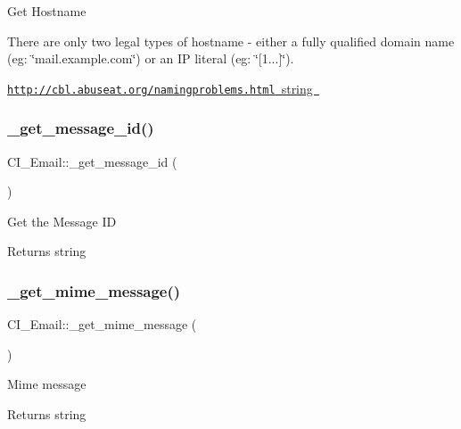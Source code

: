 Get Hostname

There are only two legal types of hostname -\/ either a fully qualified domain name (eg\+: \char`\"{}mail.\+example.\+com\char`\"{}) or an IP literal (eg\+: \char`\"{}\mbox{[}1...\mbox{]}\char`\"{}).

\mbox{\hyperlink{}{\href{http://cbl.abuseat.org/namingproblems.html}{\tt http\+://cbl.\+abuseat.\+org/namingproblems.\+html}  string }}\mbox{\label{class_c_i___email_a32a7b05f36310ca1e06a8c98d063b973}} 
\subsubsection{\texorpdfstring{\+\_\+get\+\_\+message\+\_\+id()}{\_get\_message\_id()}}
{\footnotesize\ttfamily C\+I\+\_\+\+Email\+::\+\_\+get\+\_\+message\+\_\+id (\begin{DoxyParamCaption}{ }\end{DoxyParamCaption})\hspace{0.3cm}{\ttfamily [protected]}}

Get the Message ID

\begin{DoxyReturn}{Returns}
string 
\end{DoxyReturn}
\mbox{\label{class_c_i___email_a5adf7d29a46958ec8ad14b19afcd2115}} 
\subsubsection{\texorpdfstring{\+\_\+get\+\_\+mime\+\_\+message()}{\_get\_mime\_message()}}
{\footnotesize\ttfamily C\+I\+\_\+\+Email\+::\+\_\+get\+\_\+mime\+\_\+message (\begin{DoxyParamCaption}{ }\end{DoxyParamCaption})\hspace{0.3cm}{\ttfamily [protected]}}

Mime message

\begin{DoxyReturn}{Returns}
string 
\end{DoxyReturn}
\mbox{\label{class_c_i___email_a24471eb32b0f5b27c70cc2a7214db28d}} 
